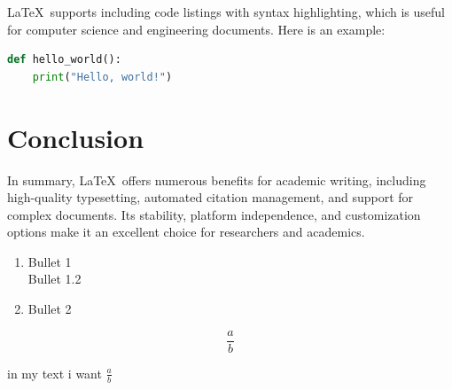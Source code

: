 \documentclass{article}
\begin{document}
\LaTeX\ supports including code listings with syntax highlighting, which is useful for computer science and engineering documents. Here is an example:

\begin{lstlisting}[language=Python, caption=Python example]
def hello_world():
    print("Hello, world!")
\end{lstlisting}

\section{Conclusion}

In summary, \LaTeX\ offers numerous benefits for academic writing, including high-quality typesetting, automated citation management, and support for complex documents. Its stability, platform independence, and customization options make it an excellent choice for researchers and academics.


\begin{enumerate}
    \item Bullet 1 \\
    Bullet 1.2
    \item Bullet 2
\end{enumerate}

\begin{equation}
    \frac{a}{b}
\end{equation}

in my text i want $\frac{a}{b}$

\printbibliography
\end{document}
